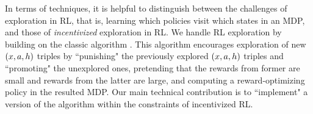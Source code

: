 In terms of techniques, it is helpful to distinguish between the challenges of exploration in RL, that is, learning which policies visit which states in an MDP, and those of  \emph{incentivized} exploration in RL. We handle  RL exploration by building on the classic \Ecubed{} algorithm \citep{kearns2002near}. This algorithm encourages exploration of new $(x,a,h)$ triples by ``punishing" the previously explored $(x,a,h)$ triples and ``promoting" the unexplored ones, \ie pretending that the rewards from former are small and rewards from the latter are large, and computing a reward-optimizing policy in the resulted MDP. Our main technical contribution is to ``implement" a version of the \Ecubed{} algorithm within the constraints of incentivized RL.




